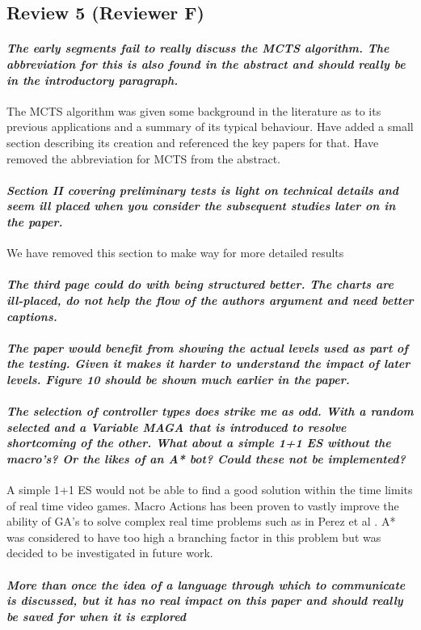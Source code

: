 \documentclass{article}
\begin{document}
\subsection{Review 5 (Reviewer F)}
\paragraph*{\textit{The early segments fail to really discuss the MCTS algorithm.  The abbreviation for this is also found in the abstract and should really be in the introductory paragraph.}}
The MCTS algorithm was given some background in the literature as to its previous applications and a summary of its typical behaviour. Have added a small section describing its creation and referenced the key papers for that.
Have removed the abbreviation for MCTS from the abstract.
\paragraph*{\textit{Section II covering preliminary tests is light on technical details and seem ill placed when you consider the subsequent studies later on in the paper.}}
We have removed this section to make way for more detailed results
\paragraph*{\textit{The third page could do with being structured better.  The charts are ill-placed, do not help the flow of the authors argument and need better captions.}}
\paragraph*{\textit{The paper would benefit from showing the actual levels used as part of the testing.  Given it makes it harder to understand the impact of later levels.  Figure 10 should be shown much earlier in the paper.}}
\paragraph*{\textit{The selection of controller types does strike me as odd.  With a random selected and a Variable MAGA that is introduced to resolve shortcoming of the other.  What about a simple 1+1 ES without the macro's?  Or the likes of an A* bot?  Could these not be implemented?}}
A simple 1+1 ES would not be able to find a good solution within the time limits of real time video games. Macro Actions has been proven to vastly improve the ability of GA's to solve complex real time problems such as in Perez et al \cite{perez2013rolling}. A* was considered to have too high a branching factor in this problem but was decided to be investigated in future work.
\paragraph*{\textit{More than once the idea of a language through which to communicate is discussed, but it has no real impact on this paper and should really be saved for when it is explored}}



\end{document}
